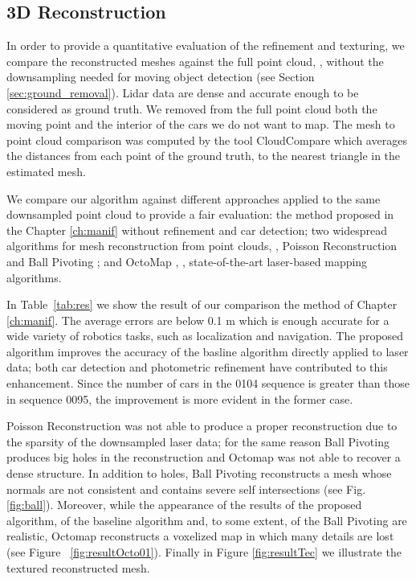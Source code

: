 \subsection{3D Reconstruction}

In order to provide a quantitative evaluation of the refinement and texturing, we compare the reconstructed meshes against the full point cloud, \ie, without the downsampling needed for moving object detection (see Section~ \ref{sec:ground_removal}). Lidar data are dense and accurate enough to be considered as ground truth. 
We removed from the full point cloud both the moving point and the interior of the cars we do not want to map.
The mesh to point cloud comparison was computed by the tool CloudCompare \cite{cloudcompare} which averages the distances from each point of the ground truth, to the  nearest triangle in the estimated mesh.

We compare our algorithm against different approaches applied to the same downsampled point cloud to provide a fair evaluation: the method proposed in the Chapter \ref{ch:manif} without refinement and car detection; two widespread algorithms for mesh reconstruction from point clouds, \ie, Poisson Reconstruction \cite{kazhdan2006poisson} and Ball Pivoting \cite{bernardini1999ball}; and OctoMap \cite{hornung2013octomap}, \ie, state-of-the-art laser-based mapping algorithms.

In Table~\ref{tab:res} we show the result of our comparison  the method of Chapter \ref{ch:manif}.
The average errors are below 0.1 m which is enough accurate for a wide variety of robotics tasks, such as localization and navigation. 
The proposed algorithm improves the accuracy of the basline algorithm directly applied to laser data; both car detection and photometric refinement have contributed to this enhancement. 
Since the number of cars in the 0104 sequence is greater than those in sequence 0095, the improvement is more evident in the former case.

Poisson Reconstruction was not able to produce a proper reconstruction due to the sparsity of the downsampled laser data; for the same reason Ball Pivoting produces big holes in the reconstruction and Octomap was not able to recover a dense structure. 
In addition to holes, Ball Pivoting reconstructs a mesh whose normals are not consistent and contains severe self intersections (see Fig. \ref{fig:ball}).
Moreover, while the appearance of the results of the proposed algorithm, of the baseline algorithm and, to some extent, of the Ball Pivoting are realistic, Octomap reconstructs a voxelized map in which many details are lost (see  Figure ~\ref{fig:resultOcto01}). Finally in Figure \ref{fig:resultTec} we illustrate the textured reconstructed mesh.


